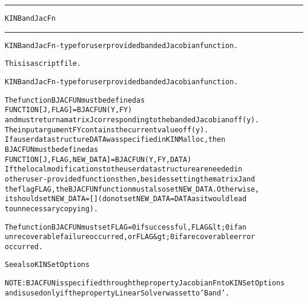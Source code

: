 \begin{samepage}
\hrule
\begin{center}
{\large \verb!KINBandJacFn!}
\label{p:KINBandJacFn}
\end{center}
\hrule\vspace{0.1in}



\begin{alltt}
KINBandJacFn - type for user provided banded Jacobian function.
\end{alltt}

\end{samepage}



\begin{samepage}


\begin{alltt}
This is a script file. 
\end{alltt}

\end{samepage}



\begin{alltt}
KINBandJacFn - type for user provided banded Jacobian function.

   The function BJACFUN must be defined as 
        FUNCTION [J, FLAG] = BJACFUN(Y, FY)
   and must return a matrix J corresponding to the banded Jacobian of f(y).
   The input argument FY contains the current value of f(y).
   If a user data structure DATA was specified in KINMalloc, then
   BJACFUN must be defined as
        FUNCTION [J, FLAG, NEW_DATA] = BJACFUN(Y, FY, DATA)
   If the local modifications to the user data structure are needed in
   other user-provided functions then, besides setting the matrix J and
   the flag FLAG, the BJACFUN function must also set NEW_DATA. Otherwise, 
   it should set NEW_DATA=[] (do not set NEW_DATA = DATA as it would lead
   to unnecessary copying).

   The function BJACFUN must set FLAG=0 if successful, FLAG&lt;0 if an
   unrecoverable failure occurred, or FLAG&gt;0 if a recoverable error
   occurred.

   See also KINSetOptions

   NOTE: BJACFUN is specified through the property JacobianFn to KINSetOptions
   and is used only if the property LinearSolver was set to 'Band'.
\end{alltt}






\vspace{0.1in}